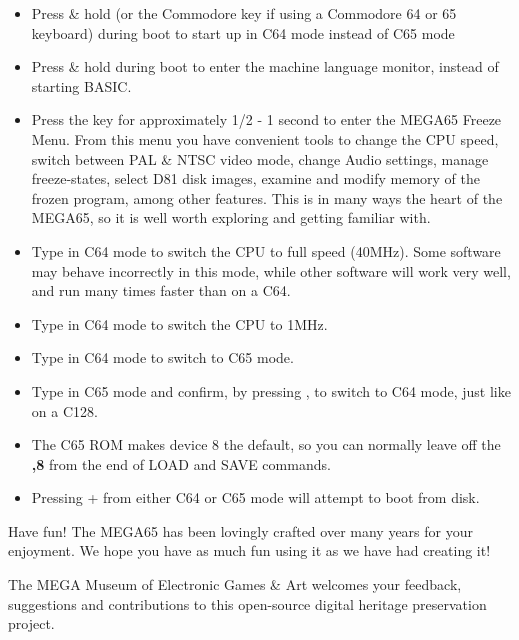 \begin{itemize}

\item{Press \& hold \megasymbolkey (or the Commodore key if using a Commodore 64 or 65 keyboard) during boot to start up in C64 mode instead of C65 mode}
 \item{Press \& hold  during boot to enter the machine language monitor, instead of starting BASIC.}
\item{Press the  key for approximately 1/2 - 1 second to enter the MEGA65 Freeze Menu.  From this menu
  you have convenient tools to change the CPU speed, switch between PAL \& NTSC video mode, change Audio settings, manage freeze-states,
   select D81 disk images, examine and modify memory of the frozen program, among other features.  This is in many ways the heart of the MEGA65, so it is well worth exploring and getting familiar with.}
\item{Type  in C64 mode to switch  the CPU to full speed (40MHz). Some software may behave incorrectly in this mode, while other software will work very well, and run many times faster than on a C64.}
\item{Type  in C64 mode to switch the CPU to 1MHz.}
\item{Type  in C64 mode to switch to C65 mode.}
\item{Type  in C65 mode and confirm, by pressing , to switch to C64 mode, just like on a C128.}
\item{The C65 ROM makes device 8 the default, so you can normally leave off the \textbf{,8} from the end of LOAD and SAVE commands.}
\item{Pressing  +  from either C64 or C65 mode will attempt to boot from disk.}
\end{itemize}

Have fun! The MEGA65 has been lovingly crafted over many years for your enjoyment. We hope you have as much fun using it as we have had creating it!

The MEGA Museum of Electronic Games \& Art welcomes your feedback, suggestions and contributions to this open-source digital heritage preservation project.
